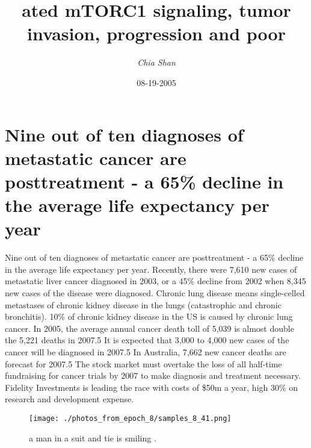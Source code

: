 \documentclass{article}%
\title{ated mTORC1 signaling, tumor invasion, progression and poor}%
\author{\textit{Chia Shan}}%
\date{08-19-2005}%
\begin{document}
%
\normalsize%
\maketitle%
\section{Nine out of ten diagnoses of metastatic cancer are posttreatment {-} a 65\% decline in the average life expectancy per year}%
\label{sec:Nineoutoftendiagnosesofmetastaticcancerareposttreatment{-}a65declineintheaveragelifeexpectancyperyear}%
Nine out of ten diagnoses of metastatic cancer are posttreatment {-} a 65\% decline in the average life expectancy per year.\newline%
Recently, there were 7,610 new cases of metastatic liver cancer diagnosed in 2003, or a 45\% decline from 2002 when 8,345 new cases of the disease were diagnosed.\newline%
Chronic lung disease means single{-}celled metastases of chronic kidney disease in the lungs (catastrophic and chronic bronchitis). 10\% of chronic kidney disease in the US is caused by chronic lung cancer.\newline%
In 2005, the average annual cancer death toll of 5,039 is almost double the 5,221 deaths in 2007.5\newline%
It is expected that 3,000 to 4,000 new cases of the cancer will be diagnosed in 2007.5\newline%
In Australia, 7,662 new cancer deaths are forecast for 2007.5\newline%
The stock market must overtake the loss of all half{-}time fundraising for cancer trials by 2007 to make diagnosis and treatment necessary.\newline%
Fidelity Investments is leading the race with costs of \$50m a year, high 30\% on research and development expense.\newline%

%


\begin{figure}[h!]%
\centering%
\texttt{[image: ./photos\_from\_epoch\_8/samples\_8\_41.png]}%
\caption{a man in a suit and tie is smiling .}%
\end{figure}

%
\end{document}
